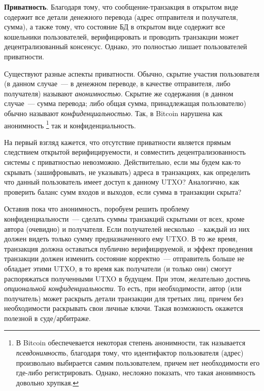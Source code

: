 \documentclass{article}
\begin{document}
{\bf Приватность}.
 Благодаря тому, что сообщение-транзакция в открытом виде
содержит все детали денежного перевода (адрес отправителя и получателя, сумма),
а также тому, что состояние БД в открытом виде содержит все кошельники пользователей,
верифицировать и проводить транзакции может децентрализованный консенсус.
Однако, это полностью лишает пользователей приватности.

Существуют разные аспекты приватности. Обычно, скрытие участия пользователя
(в данном случае~--- в денежном переводе, в качестве отправителя, либо получателя)
 называют \textit{анонимностью}. Скрытие же содержания (в данном случае~--- сумма перевода;
 либо общая сумма, принадлежащая пользователю)  обычно называют \textit{конфиденциальностью}.
Так, в Bitcoin нарушена как анонимность
\footnote{ В Bitcoin обеспечевается некоторая степень анонимности, так называется \textit{псевдонимность},
благодаря тому, что идентифактор пользователя (адрес) произвольно выбирается самим пользователем,
причем нет необходимости его где-либо регистрировать. Однако, несложно показать, что такая анонимность
довольно хрупкая.}
 так и конфиденциальность.

 На первый взгляд кажется, что отсутствие приватности является прямым следствием
 открытой верифицируемости, и совместить децентрализованность системы с приватностью невозможно.
 Действительно, если мы будем как-то скрывать (зашифровывать, не указывать) адреса в транзакциях, как определить что
 данный пользователь имеет доступ к данному UTXO?
 Аналогично, как проверить баланс сумм входов и выходов, если сумма в транзакции скрыта?


 Оставив пока что анонимность, поробуем решить проблему конфиденциальности~---
 сделать суммы транзакций скрытыми от всех, кроме автора (очевидно) и получателя.
 Если получателей несколько~-- каждый из них должен видеть только сумму предназначенного ему UTXO.
 В то же время, транзакция должна оставаться публично верифицируемой,
 и эффект проведения транзакции должен изменить состояние корректно~--- отправитель больше не обладает
 этими UTXO, в то время как получатели (и только они) смогут распоряжаться полученными UTXO в будущем.
 При этом, желательно достичь \textit{опциональной конфиденциальности}.
 То есть, при необходимости, автор (или получатель) может раскрыть детали транзакции для
 третьих лиц, причем без необходимости раскрывать свои личные ключи.
 Такая возможность окажется полезной в суде/арбитраже.
\end{document}
